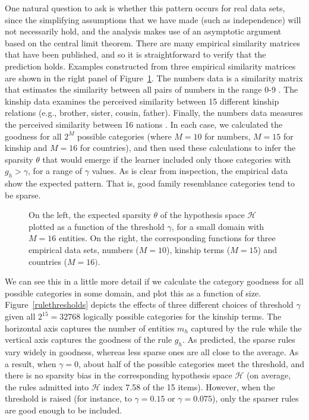 \documentclass{apa}
\newcommand{\ruleset}{\mathcal{H}}
\begin{document}
One natural question to ask is whether this pattern occurs for real data sets, since the simplifying assumptions that we have made (such as independence) will not necessarily hold, and the analysis makes use of an asymptotic argument based on the central limit theorem. There are many empirical similarity matrices that have been published, and so it is straightforward to verify that the prediction holds. Examples constructed from three empirical similarity matrices are shown in the right panel of Figure~\ref{expectedsparsity}. The numbers data is a similarity matrix that estimates the similarity between all pairs of numbers in the range 0-9 \cite{Shepard1975}. The kinship data \cite{Rosenberg1975} examines the perceived similarity between 15 different kinship relations (e.g., brother, sister, cousin, father). Finally, the numbers data measures the perceived similarity between 16 nations \cite{Navarro2002}. In each case, we calculated the goodness for all $2^M$ possible categories (where $M=10$ for numbers, $M=15$ for kinship and $M=16$ for countries), and then used these calculations to infer the sparsity $\theta$ that would emerge if the learner included only those categories with $g_h>\gamma$, for a range of $\gamma$ values. As is clear from inspection, the empirical data show the expected pattern. That is, good family resemblance categories tend to be sparse.


\begin{figure}
\begin{center}
\caption{On the left, the expected sparsity $\theta$ of the hypothesis space $\ruleset$ plotted as a function of the threshold $\gamma$, for a small domain with $M=16$ entities. On the right, the corresponding functions for three empirical data sets, numbers ($M=10$), kinship terms ($M=15$) and countries ($M=16)$.} \label{expectedsparsity}
\end{center}
\end{figure}


We can see this in a little more detail if we calculate the category goodness for all possible categories in some domain, and plot this as a function of size. Figure~\ref{rulethresholds} depicts the effects of three different choices of threshold $\gamma$ given all $2^{15}=32768$ logically possible categories for the kinship terms. The horizontal axis captures the number of entities $m_h$ captured by the rule while the vertical axis captures the goodness of the rule $g_h$. As predicted, the sparse rules vary widely in goodness, whereas less sparse ones are all close to the average. As a result, when $\gamma=0$, about half of the possible categories meet the threshold, and there is no sparsity bias in the corresponding hypothesis space $\ruleset$ (on average, the rules admitted into $\ruleset$ index 7.58 of the 15 items). However, when the threshold is raised (for instance, to $\gamma=0.15$ or $\gamma=0.075$), only the sparser rules are good enough to be included.
\end{document}
